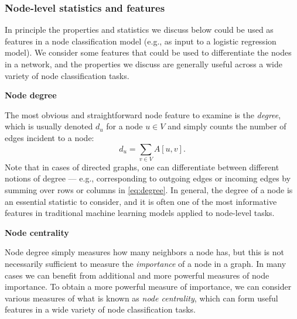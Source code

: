 \documentclass[10pt]{book}
\let\defaultmarginpar\marginpar
\renewcommand\marginpar[2][]{\defaultmarginpar{\itshape\color{gray}#2}}
\begin{document}
\subsubsection{Node-level statistics and features}

In principle the properties and statistics we discuss below could be used as features in a node classification model (e.g., as input to a logistic regression model). We consider some features that could be used to differentiate the nodes in a network, and the properties we discuss are generally useful across a wide variety of node classification tasks.
\smallskip

\textbf{Node degree}

The most obvious and straightforward node feature to examine is the \emph{degree}\marginpar{degree}, which is usually denoted $d_u$ for a node $u \in V$ and simply counts the number of edges incident to a node:
\begin{equation}
    d_u = \sum_{v \in V} A[u, v].
    \label{eq:degree}
\end{equation}
Note that in cases of directed graphs, one can differentiate between
different notions of degree --- e.g., corresponding to outgoing edges or incoming edges by summing over rows or columns in \autoref{eq:degree}. In general, the degree of a node is an essential statistic to consider, and it is often one of the most informative features in traditional machine learning models applied to node-level tasks.
\smallskip

\textbf{Node centrality}

Node degree simply measures how many neighbors a node has, but this is not necessarily sufficient to measure the \emph{importance} of a node in a graph. In many cases we can benefit from additional and more powerful measures of node importance. To obtain a more powerful measure of importance, we can consider various measures of what is
known as \emph{node centrality}\marginpar{node centrality}, which can form useful features in a wide variety of node classification tasks.
\end{document}
